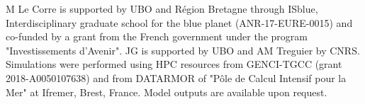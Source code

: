 \documentclass[os, manuscript]{copernicus}
\begin{document}

\begin{acknowledgements}
M Le Corre is supported by UBO and Région Bretagne through ISblue, Interdisciplinary graduate school for the blue planet (ANR-17-EURE-0015) and co-funded by a grant from the French government under the program "Investissements d'Avenir". JG  is supported by UBO and AM Treguier by CNRS. Simulations were performed using HPC resources from GENCI-TGCC (grant 2018-A0050107638) and from DATARMOR of "Pôle de Calcul Intensif pour la Mer" at Ifremer, Brest, France. Model outputs are available upon request.
\end{acknowledgements}

















\end{document}
